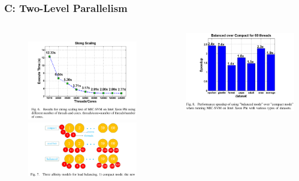 \documentclass{beamer}
\begin{document}
\begin{frame}
	\frametitle{C: Two-Level Parallelism}
	\begin{columns}[c] %
		\begin{figure}
			\includegraphics[width=0.9\textwidth]{figs/fig6_strongscaling.png} \\
			\includegraphics[width=0.9\textwidth]{figs/fig7_affinitymodel.png}
		\end{figure}
		\includegraphics[width=0.9\textwidth]{figs/fig8_balancedmode.png}

\end{columns}
\end{frame}
\end{document}
